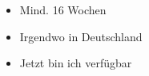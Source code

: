 


\twocolumnsection
{
	\begin{skills}
	\end{skills}
}
{
	\vspace{1em}
	\begin{itemize}
		\item Mind. 16 Wochen
		\item Irgendwo in Deutschland
		\item Jetzt bin ich verfügbar
	\end{itemize}
}

